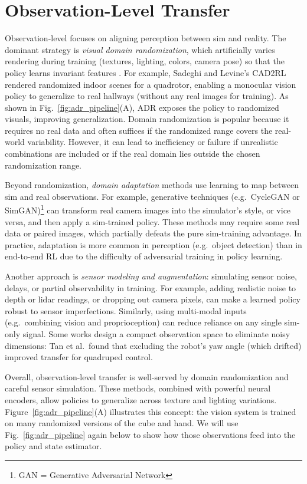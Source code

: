 \section{Observation-Level Transfer}
Observation-level \simtoreal focuses on aligning perception between sim and reality. The dominant strategy is \emph{visual domain randomization}, which artificially varies rendering during training (textures, lighting, colors, camera pose) so that the policy learns invariant features \cite{Sadeghi2017,Tobin2017}. For example, Sadeghi and Levine’s CAD2RL rendered randomized indoor scenes for a quadrotor, enabling a monocular vision policy to generalize to real hallways (without any real images for training)\cite{Sadeghi2017}. As shown in Fig.~\ref{fig:adr_pipeline}(A), ADR exposes the policy to randomized visuals, improving generalization. Domain randomization is popular because it requires no real data and often suffices if the randomized range covers the real-world variability. However, it can lead to inefficiency or failure if unrealistic combinations are included or if the real domain lies outside the chosen randomization range.

Beyond randomization, \emph{domain adaptation} methods use learning to map between sim and real observations. For example, generative techniques (e.g.\ CycleGAN or SimGAN)\footnote{GAN = Generative Adversarial Network} can transform real camera images into the simulator’s style, or vice versa, and then apply a sim-trained policy\cite{Tzeng2017}. These methods may require some real data or paired images, which partially defeats the pure sim-training advantage. In practice, adaptation is more common in perception (e.g.\ object detection) than in end-to-end RL due to the difficulty of adversarial training in policy learning.

Another approach is \emph{sensor modeling and augmentation}: simulating sensor noise, delays, or partial observability in training. For example, adding realistic noise to depth or lidar readings, or dropping out camera pixels, can make a learned policy robust to sensor imperfections. Similarly, using multi-modal inputs (e.g.\ combining vision and proprioception) can reduce reliance on any single sim-only signal. Some works design a compact observation space to eliminate noisy dimensions: Tan et al.\ found that excluding the robot’s yaw angle (which drifted) improved transfer for quadruped control\cite{Tan2018}. 

Overall, observation-level transfer is well-served by domain randomization and careful sensor simulation. These methods, combined with powerful neural encoders, allow policies to generalize across texture and lighting variations\cite{Tobin2017,Sadeghi2017}. Figure~\ref{fig:adr_pipeline}(A) illustrates this concept: the vision system is trained on many randomized versions of the cube and hand. We will use Fig.~\ref{fig:adr_pipeline} again below to show how those observations feed into the policy and state estimator.

